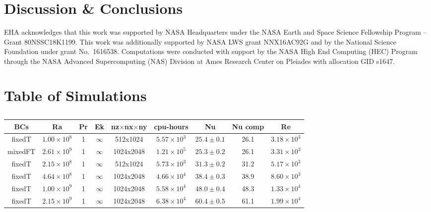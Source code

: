 \documentclass[aps, pre, onecolumn, nofootinbib, notitlepage, groupedaddress, amsfonts, amssymb, amsmath, longbibliography]{revtex4-1}
\begin{document}

\section{Discussion \& Conclusions}
\label{sec:extensions}

\begin{acknowledgments}
EHA acknowledges that this work was supported by NASA Headquarters under the NASA Earth and Space Science Fellowship Program -- Grant 80NSSC18K1199.
This work was additionally supported by NASA LWS grant NNX16AC92G and by the National Science Foundation under grant No.~1616538. 
Computations were conducted with support by the NASA High End Computing (HEC) Program through the NASA  Advanced Supercomputing (NAS) Division at Ames Research Center on Pleiades with allocation GID s1647.
\end{acknowledgments}




\appendix
\section{Table of Simulations}


\begin{table}[ht]
\caption{
}
\setlength{\tabcolsep}{12pt}
\label{table:speed}
\begin{center}
\begin{tabularx}{\textwidth}{c c c c c c c c c}
\hline																	
BCs	&	Ra	&	Pr	&	Ek	&	nz$\times$nx$\times$ny	&	cpu-hours &	Nu	&	Nu comp	&	Re \\
\hline
fixedT	&	$1.00 \times 10^8$	&	1	&	$\infty$	&	512x1024	&	$5.57 \times 10^3$	&	$25.4 \pm 0.1$	&	26.1	&	$3.18 \times 10^3$ \\
mixedFT	&	$2.61 \times 10^9$	&	1	&	$\infty$	&	1024x2048	&	$1.21 \times 10^5$	&	$25.3 \pm 0.2$	&	26.1	&	$3.31 \times 10^3$ \\
fixedT	&	$2.15 \times 10^8$	&	1	&	$\infty$	&	512x1024	&	$5.73 \times 10^3$	&	$31.3 \pm 0.2$	&	31.2	&	$5.17 \times 10^3$ \\
fixedT	&	$4.64 \times 10^8$	&	1	&	$\infty$	&	1024x2048	&	$4.66 \times 10^4$	&	$38.4 \pm 0.3$	&	38.9	&	$8.60 \times 10^3$ \\
fixedT	&	$1.00 \times 10^9$	&	1	&	$\infty$	&	1024x2048	&	$5.58 \times 10^4$	&	$48.0 \pm 0.4$	&	48.3	&	$1.33 \times 10^4$ \\
fixedT	&	$2.15 \times 10^9$	&	1	&	$\infty$	&	1024x2048	&	$6.38 \times 10^4$	&	$60.4 \pm 0.5$	&	61.1	&	$1.99 \times 10^4$ \\
\hline																	
\end{tabularx}
\end{center}
\end{table}
\end{document}
